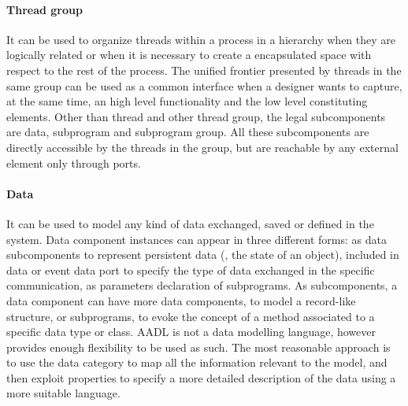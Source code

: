 \paragraph{Thread group} It can be used to organize threads within a process in a hierarchy when they are logically related or when it is necessary to create a encapsulated space with respect to the rest of the process. The unified frontier presented by threads in the same group can be used as a common interface when a designer wants to capture, at the same time, an high level functionality and the low level constituting elements. Other than thread and other thread group, the legal subcomponents are data, subprogram and subprogram group. All these subcomponents are directly accessible by the threads in the group, but are reachable by any external element only through ports.

\paragraph{Data} It can be used to model any kind of data exchanged, saved or defined in the system. Data component instances can appear in three different forms: as data subcomponents to represent persistent data (\eg, the state of an object), included in data or event data port to specify the type of data exchanged in the specific communication, as parameters declaration of subprograms. As subcomponents, a data component can have more data components, to model a record-like structure, or subprograms, to evoke the concept of a method associated to a specific data type or class. AADL is not a data modelling language, however provides enough flexibility to be used as such. The most reasonable approach is to use the data category to map all the information relevant to the model, and then exploit properties to specify a more detailed description of the data using a more suitable language.

